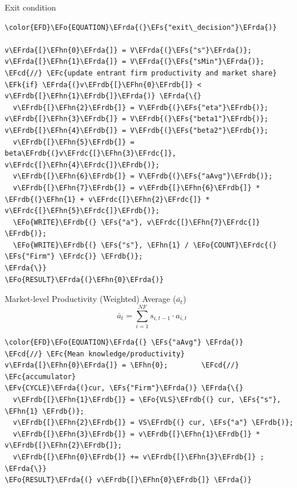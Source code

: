 \documentclass[bigger,aspectratio=169]{beamer}
\newcommand{\EFc}[1]{\textcolor{EFc}{#1}} %
\newcommand{\EFcd}[1]{\textcolor{EFcd}{#1}} %
\newcommand{\EFs}[1]{\textcolor{EFs}{#1}} %
\newcommand{\EFk}[1]{\textcolor{EFk}{#1}} %
\newcommand{\EFv}[1]{\textcolor{EFv}{#1}} %
\newcommand{\EFo}[1]{\textcolor{EFo}{#1}} %
\newcommand{\EFhn}[1]{\textcolor{EFhn}{\textbf{#1}}} %
\newcommand{\EFrda}[1]{\textcolor{EFrda}{#1}} %
\newcommand{\EFrdb}[1]{\textcolor{EFrdb}{#1}} %
\newcommand{\EFrdc}[1]{\textcolor{EFrdc}{#1}} %
\begin{document}
\begin{frame}[label={sec:orgcca1d63},fragile]{Exit condition}
 \begin{Code}
\begin{Verbatim}
\color{EFD}\EFo{EQUATION}\EFrda{(}\EFs{"exit\_decision"}\EFrda{)}

v\EFrda{[}\EFhn{0}\EFrda{]} = V\EFrda{(}\EFs{"s"}\EFrda{)}; v\EFrda{[}\EFhn{1}\EFrda{]} = V\EFrda{(}\EFs{"sMin"}\EFrda{)};
\EFcd{//} \EFc{update entrant firm productivity and market share}
\EFk{if} \EFrda{(}v\EFrdb{[}\EFhn{0}\EFrdb{]} < v\EFrdb{[}\EFhn{1}\EFrdb{]}\EFrda{)} \EFrda{\{}
  v\EFrdb{[}\EFhn{2}\EFrdb{]} = V\EFrdb{(}\EFs{"eta"}\EFrdb{)}; v\EFrdb{[}\EFhn{3}\EFrdb{]} = V\EFrdb{(}\EFs{"beta1"}\EFrdb{)}; v\EFrdb{[}\EFhn{4}\EFrdb{]} = V\EFrdb{(}\EFs{"beta2"}\EFrdb{)};
  v\EFrdb{[}\EFhn{5}\EFrdb{]} = beta\EFrdb{(}v\EFrdc{[}\EFhn{3}\EFrdc{]}, v\EFrdc{[}\EFhn{4}\EFrdc{]}\EFrdb{)};
  v\EFrdb{[}\EFhn{6}\EFrdb{]} = V\EFrdb{(}\EFs{"aAvg"}\EFrdb{)};
  v\EFrdb{[}\EFhn{7}\EFrdb{]} = v\EFrdb{[}\EFhn{6}\EFrdb{]} * \EFrdb{(}\EFhn{1} + v\EFrdc{[}\EFhn{2}\EFrdc{]} * v\EFrdc{[}\EFhn{5}\EFrdc{]}\EFrdb{)};
  \EFo{WRITE}\EFrdb{(} \EFs{"a"}, v\EFrdc{[}\EFhn{7}\EFrdc{]} \EFrdb{)};
  \EFo{WRITE}\EFrdb{(} \EFs{"s"}, \EFhn{1} / \EFo{COUNT}\EFrdc{(} \EFs{"Firm"} \EFrdc{)} \EFrdb{)};
\EFrda{\}}
\EFo{RESULT}\EFrda{(}\EFhn{0}\EFrda{)}
\end{Verbatim}
\end{Code}
\end{frame}
\begin{frame}[label={sec:org14be310},fragile]{Market-level Productivity (Weighted) Average (\(\bar{a_{t}}\))}
 \begin{equation}
\bar{a}_{t} =  \sum_{i=1}^{NF} s_{i, t-1}\cdot a_{i,t}
\end{equation}


\begin{Code}
\begin{Verbatim}
\color{EFD}\EFo{EQUATION}\EFrda{(} \EFs{"aAvg"} \EFrda{)}
\EFcd{//} \EFc{Mean knowledge/productivity}
v\EFrda{[}\EFhn{0}\EFrda{]} = \EFhn{0};        \EFcd{//} \EFc{accumulator}
\EFv{CYCLE}\EFrda{(}cur, \EFs{"Firm"}\EFrda{)} \EFrda{\{}
  v\EFrdb{[}\EFhn{1}\EFrdb{]} = \EFo{VLS}\EFrdb{(} cur, \EFs{"s"}, \EFhn{1} \EFrdb{)};
  v\EFrdb{[}\EFhn{2}\EFrdb{]} = VS\EFrdb{(} cur, \EFs{"a"} \EFrdb{)};
  v\EFrdb{[}\EFhn{3}\EFrdb{]} = v\EFrdb{[}\EFhn{1}\EFrdb{]} * v\EFrdb{[}\EFhn{2}\EFrdb{]};
  v\EFrdb{[}\EFhn{0}\EFrdb{]} += v\EFrdb{[}\EFhn{3}\EFrdb{]} ;
\EFrda{\}}
\EFo{RESULT}\EFrda{(} v\EFrdb{[}\EFhn{0}\EFrdb{]} \EFrda{)}
\end{Verbatim}
\end{Code}
\end{frame}
\end{document}
